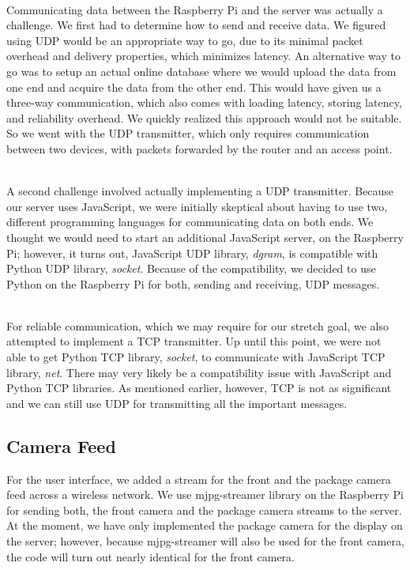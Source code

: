 \documentclass[onecolumn, oneside, letterpaper, draftclsnofoot, 10pt, compsoc]{IEEEtran}
\begin{document}
\noindent \\
Communicating data between the Raspberry Pi and the server was actually a challenge. We first had to determine how to send and receive data. We figured using UDP would be an appropriate way to go, due to its minimal packet overhead and delivery properties, which minimizes latency. An alternative way to go was to setup an actual online database where we would upload the data from one end and acquire the data from the other end. This would have given us a three-way communication, which also comes with loading latency, storing latency, and reliability overhead. We quickly realized this approach would not be suitable. So we went with the UDP transmitter, which only requires communication between two devices, with packets forwarded by the router and an access point.

\noindent \\
A second challenge involved actually implementing a UDP transmitter. Because our server uses JavaScript, we were initially skeptical about having to use two, different programming languages for communicating data on both ends. We thought we would need to start an additional JavaScript server, on the Raspberry Pi; however, it turns out, JavaScript UDP library, \textit{dgram}, is compatible with Python UDP library, \textit{socket}. Because of the compatibility, we decided to use Python on the Raspberry Pi for both, sending and receiving, UDP messages.

\noindent \\
For reliable communication, which we may require for our stretch goal, we also attempted to implement a TCP transmitter. Up until this point, we were not able to get Python TCP library, \textit{socket}, to communicate with JavaScript TCP library, \textit{net}. There may very likely be a compatibility issue with JavaScript and Python TCP libraries. As mentioned earlier, however, TCP is not as significant and we can still use UDP for transmitting all the important messages.

\subsection{Camera Feed}
\noindent
For the user interface, we added a stream for the front and the package camera feed across a wireless network. We use mjpg-streamer library on the Raspberry Pi for sending both, the front camera and the package camera streams to the server. At the moment, we have only implemented the package camera for the display on the server; however, because mjpg-streamer will also be used for the front camera, the code will turn out nearly identical for the front camera.
\end{document}
